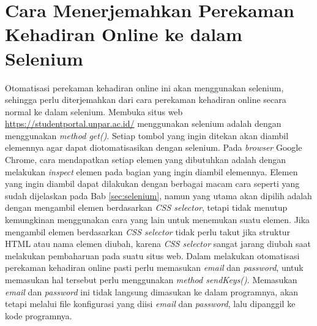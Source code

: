 \section{Cara Menerjemahkan Perekaman Kehadiran Online ke dalam Selenium}
\label{sec:terjemah} 
Otomatisasi perekaman kehadiran online ini akan menggunakan selenium, sehingga perlu diterjemahkan dari cara perekaman kehadiran online secara normal ke dalam selenium. Membuka situs web \url{https://studentportal.unpar.ac.id/} menggunakan selenium adalah dengan menggunakan \textit{method get()}. Setiap tombol yang ingin ditekan akan diambil elemennya agar dapat diotomatisasikan dengan selenium. Pada \textit{browser} Google Chrome, cara mendapatkan setiap elemen yang dibutuhkan adalah dengan melakukan \textit{inspect} elemen pada bagian yang ingin diambil elemennya. Elemen yang ingin diambil dapat dilakukan dengan berbagai macam cara seperti yang sudah dijelaskan pada Bab \ref{sec:selenium}, namun yang utama akan dipilih adalah dengan mengambil elemen berdasarkan \textit{CSS selector}, tetapi tidak menutup kemungkinan menggunakan cara yang lain untuk menemukan suatu elemen. Jika mengambil elemen berdasarkan \textit{CSS selector} tidak perlu takut jika struktur HTML atau nama elemen diubah, karena \textit{CSS selector} sangat jarang diubah saat melakukan pembaharuan pada suatu situs web. Dalam melakukan otomatisasi perekaman kehadiran online pasti perlu memasukan \textit{email} dan \textit{password}, untuk memasukan hal tersebut perlu menggunakan \textit{method sendKeys()}. Memasukan \textit{email} dan \textit{password} ini tidak langsung dimasukan ke dalam programnya, akan tetapi melalui file konfigurasi yang diisi \textit{email} dan \textit{password}, lalu dipanggil ke kode programnya. 


